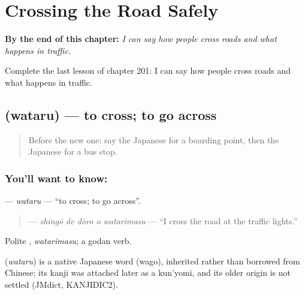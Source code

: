 
\chapter{Crossing the Road Safely}
\label{ch:ja-crossing-the-road-safely}

\begin{chapteropening}
\textbf{By the end of this chapter:} \emph{I can say how people cross roads and what happens in traffic.}

Complete the last lesson of chapter 201: I can say how people cross roads and what happens in traffic.
\end{chapteropening}

\section[\texorpdfstring{\ja{わたる} (wataru)}{わたる (wataru)}]{ (wataru) — to cross; to go across}

\label{lesson:JA-C201-wataru}



\begin{quote}
Before the new one: say the Japanese for a boarding point, then the Japanese for a bus stop.
\end{quote}

\subsection*{You'll want to know: }
\textbf{} — \emph{wataru} — \textquotedblleft{}to cross; to go across\textquotedblright{}.

\begin{quote}
\textbf{  } — \emph{shingō de dōro o watarimasu} — \textquotedblleft{}I cross the road at the traffic lights.\textquotedblright{}
\end{quote}

Polite \textbf{}, \emph{watarimasu}; a godan verb.

\begin{cousinweb}
\textbf{} (\emph{wataru}) is a native Japanese word (wago), inherited rather than borrowed from Chinese; its kanji was attached later as a kun'yomi, and its older origin is not settled (JMdict, KANJIDIC2).
\end{cousinweb}

